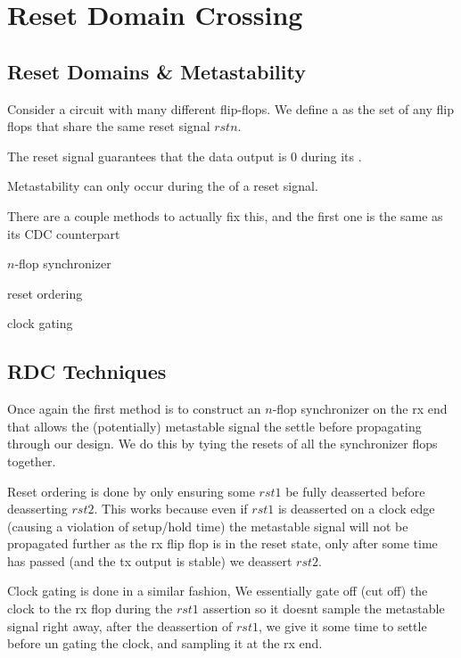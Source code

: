 \chapter{Reset Domain Crossing}

\section{Reset Domains \& Metastability}

Consider a circuit with many different flip-flops. We define a  as the set of any flip flops that share the same reset signal $rstn$.
\begin{bullets}
	\item The reset signal guarantees that the data output is 0 during its .
	\item Metastability can only occur during the  of a reset signal.
\end{bullets}
 
There are a couple methods to actually fix this, and the first one is the same as its CDC counterpart
\begin{bullets}
	\item $n$-flop synchronizer
	\item reset ordering
	\item clock gating
\end{bullets}

\section{RDC Techniques}

Once again the first method is to construct an $n$-flop synchronizer on the rx end that allows the (potentially) metastable signal the settle before propagating through our design. We do this by tying the resets of all the synchronizer flops together.

Reset ordering is done by only ensuring some $rst1$ be fully deasserted before deasserting $rst2$. This works because even if $rst1$ is deasserted on a clock edge (causing a violation of setup/hold time) the metastable signal will not be propagated further as the rx flip flop is in the reset state, only after some time has passed (and the tx output is stable) we deassert $rst2$.

Clock gating is done in a similar fashion, We essentially gate off (cut off) the clock to the rx flop during the $rst1$ assertion so it doesnt sample the metastable signal right away, after the deassertion of $rst1$, we give it some time to settle before un gating the clock, and sampling it at the rx end.
